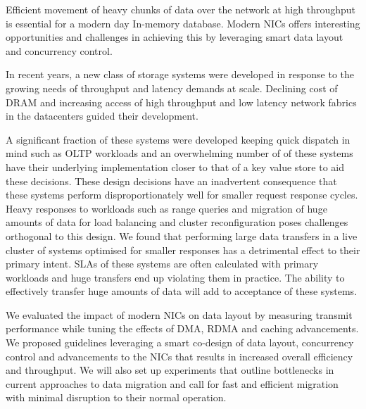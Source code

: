 

Efficient movement of heavy chunks of data over the network at high throughput 
is essential for a modern day In-memory database. Modern NICs offers interesting
opportunities and challenges in achieving this by leveraging smart data layout
and concurrency control.

In recent years, a new class of storage systems were developed in response to the growing needs of throughput
and latency demands at scale. Declining cost of DRAM and increasing access of 
high throughput and low latency network fabrics in the datacenters guided their development.

A significant fraction of these systems were developed keeping quick dispatch in mind
such as OLTP workloads and an overwhelming number of of these systems have their underlying
implementation closer to that of a key value store to aid these decisions. These design 
decisions have an inadvertent consequence that these systems perform disproportionately
well for smaller request response cycles. Heavy responses to workloads such as range queries
and migration of huge amounts of data for load balancing and cluster reconfiguration
poses challenges orthogonal to this design. We found that performing large data transfers in a live cluster 
of systems optimised for smaller responses has a detrimental effect to their primary intent. 
SLAs of these systems are often calculated with primary workloads and huge transfers end 
up violating them in practice. The ability to effectively transfer huge amounts of
data will add to acceptance of these systems.

We evaluated the impact of modern NICs on data layout by measuring transmit performance
while tuning the effects of DMA, RDMA and caching advancements. We proposed guidelines
leveraging a smart co-design of data layout, concurrency control and advancements to the
NICs that results in increased overall efficiency and throughput. We will also set up experiments
that outline bottlenecks in current approaches to data migration and call for fast and 
efficient migration with minimal disruption to their normal operation.
